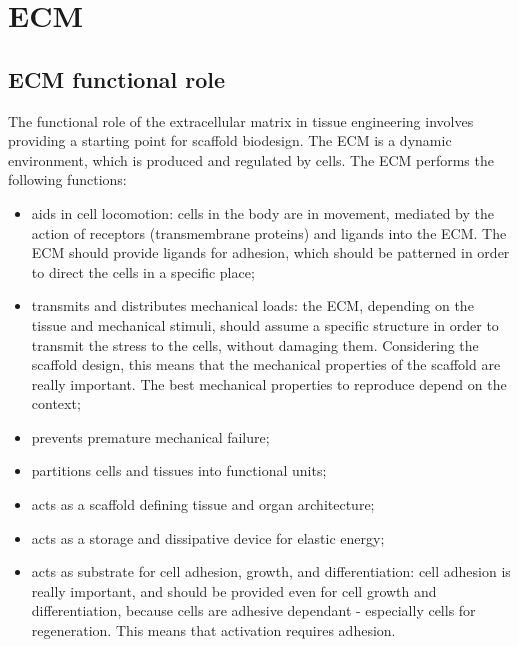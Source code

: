 \graphicspath{{chapters/03/images/}}
\chapter{ECM}

\section{ECM functional role}
The functional role of the extracellular matrix in tissue engineering involves providing a starting point for scaffold biodesign.
The ECM is a dynamic environment, which is produced and regulated by cells.
The ECM performs the following functions:

\begin{multicols}{2}
	\begin{itemize}
		\item aids in cell locomotion: cells in the body are in movement, mediated by the action of receptors (transmembrane proteins) and ligands into the ECM. The ECM should provide ligands for adhesion, which should be patterned in order to direct the cells in a specific place;
		\item transmits and distributes mechanical loads: the ECM, depending on the tissue and mechanical stimuli, should assume a specific structure in order to transmit the stress to the cells, without damaging them.
			Considering the scaffold design, this means that the mechanical properties of the scaffold are really important.
			The best mechanical properties to reproduce depend on the context;
		\item prevents premature mechanical failure;
		\item partitions cells and tissues into functional units;
		\item acts as a scaffold defining tissue and organ architecture;
		\item acts as a storage and dissipative device for elastic energy;
		\item acts as substrate for cell adhesion, growth, and differentiation: cell adhesion is really important, and should be provided even for cell growth and differentiation, because cells are adhesive dependant - especially cells for regeneration. This means that activation requires adhesion.
	\end{itemize}
\end{multicols}

